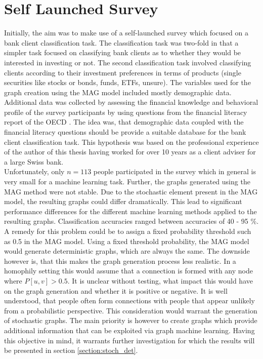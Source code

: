   \section{Self Launched Survey}
  \label{section:self_survey} 

  Initially, the aim was to make use of a self-launched survey which focused on
  a bank client classification task. The classification task was two-fold in 
  that a simpler task focused on classifying bank clients as to whether they 
  would be interested in investing or not. The second classification task
  involved classifying clients according to their investment preferences in
  terms of products (single securities like stocks or bonds, funds, ETFs,
  unsure). The variables used for the graph creation using the MAG model
  included mostly demographic data. Additional data was collected by assessing
  the financial knowledge and behavioral profile of the survey participants by 
  using questions from the financial literacy report of the OECD \citep{OECD2017}.
  The idea was, that demographic data coupled with the financial literacy
  questions should be provide a suitable database for the bank client
  classification task. This hypothesis was based on the professional experience 
  of the author of this thesis having worked for over 10 years as a client adviser
  for a large Swiss bank. \\

  \noindent Unfortunately, only $n=113$ people participated in the survey which 
  in general is very small for a machine learning task.
  Further, the graphs generated using the MAG method were not stable. Due to
  the stochastic element present in the MAG model, the resulting graphs could
  differ dramatically. This lead to significant performance differences for the
  different machine learning methods applied to the resulting graphs.
  Classification accuracies ranged between accuracies of 40 - 95 \%. A remedy
  for this problem could be to assign a fixed probability threshold such as 0.5
  in the MAG model. Using a fixed threshold probability, the MAG model would 
  generate deterministic graphs, which are always the same. The downside however 
  is, that this makes the graph generation process less realistic. In a
  homophily setting this would assume that a connection is formed with any node 
  where $P[u,v]>0.5$. It is unclear without testing, what impact this would
  have on the graph generation and whether it is positive or negative. It is
  well understood, that people often form connections with people that appear
  unlikely from a probabilistic perspective. This consideration would warrant
  the generation of stochastic graphs. The main priority is however to create
  graphs which provide additional information that can be exploited via graph
  machine learning. Having this objective in mind, it warrants further
  investigation for which the results will be presented in section 
  \ref{section:stoch_det}. \\

